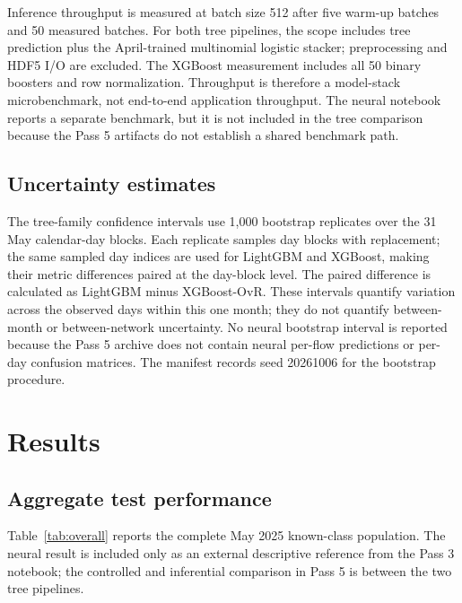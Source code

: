 \documentclass[conference]{IEEEtran}
\begin{document}
Inference throughput is measured at batch size 512 after five warm-up batches and 50 measured batches. For both tree pipelines, the scope includes tree prediction plus the April-trained multinomial logistic stacker; preprocessing and HDF5 I/O are excluded. The XGBoost measurement includes all 50 binary boosters and row normalization. Throughput is therefore a model-stack microbenchmark, not end-to-end application throughput. The neural notebook reports a separate benchmark, but it is not included in the tree comparison because the Pass 5 artifacts do not establish a shared benchmark path.

\subsection{Uncertainty estimates}

The tree-family confidence intervals use 1,000 bootstrap replicates over the 31 May calendar-day blocks. Each replicate samples day blocks with replacement; the same sampled day indices are used for LightGBM and XGBoost, making their metric differences paired at the day-block level. The paired difference is calculated as LightGBM minus XGBoost-OvR. These intervals quantify variation across the observed days within this one month; they do not quantify between-month or between-network uncertainty. No neural bootstrap interval is reported because the Pass 5 archive does not contain neural per-flow predictions or per-day confusion matrices. The manifest records seed 20261006 for the bootstrap procedure.

\section{Results}
\label{sec:results}

\subsection{Aggregate test performance}

Table~\ref{tab:overall} reports the complete May 2025 known-class population. The neural result is included only as an external descriptive reference from the Pass 3 notebook; the controlled and inferential comparison in Pass 5 is between the two tree pipelines.
\end{document}
